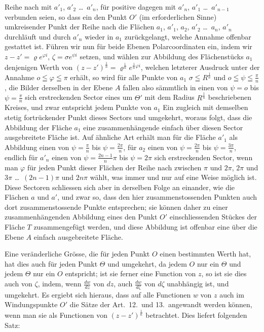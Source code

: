 \documentclass{article}
\begin{document}
Reihe nach mit $a'_1$, $a'_2$ \dots\ $a'_n$, für positive dagegen mit $a'_n$, $a'_1$ \dots\ $a'_{n-1}$ verbunden seien, so dass ein den Punkt $O'$ (im erforderlichen Sinne) umkreisender Punkt der Reihe nach die Flächen $a_1$, $a'_1$, $a_2$, $a'_2$ \dots\ $a_n$, $a'_n$ durchläuft und durch $a'_n$ wieder in $a_1$ zurückgelangt, welche Annahme offenbar gestattet ist. Führen wir nun für beide Ebenen Polarcoordinaten ein, indem wir $z - z' = \varrho e^{\varphi i}$, $\zeta = \sigma e^{\psi i}$ setzen, und wählen zur Abbildung des Flächenstücks $a_1$ denjenigen Werth von $(z - z')^{\frac{1}{n}} = \varrho^{\frac{1}{n}} e^{\frac{1}{n}\varphi i}$, welchen letzterer Ausdruck unter der Annahme $o \leqq \varphi \leqq \pi$ erhält, so wird für alle Punkte von $a_1$ $\sigma \leqq R^{\frac{1}{n}}$ und $o \leqq \psi \leqq \frac{\pi}{n}$, die Bilder derselben in der Ebene $A$ fallen also sämmtlich in einen von $\psi = o$ bis $\psi = \frac{\pi}{n}$ sich erstreckenden Sector eines um $\varTheta'$ mit dem Radius $R^{\frac{1}{n}}$ beschriebenen Kreises, und zwar entspricht jedem Punkte von $a_1$ Ein zugleich mit demselben stetig fortrückender Punkt dieses Sectors und umgekehrt, woraus folgt, dass die Abbildung der Fläche $a_1$ eine zusammenhängende einfach über diesen Sector ausgebreitete Fläche ist. Auf ähnliche Art erhält man für die Fläche $a'_1$ als Abbildung einen von $\psi = \frac{\pi}{n}$ bis $\psi = \frac{2\pi}{n}$, für $a_2$ einen von $\psi = \frac{2\pi}{n}$ bis $\psi = \frac{3\pi}{n}$, endlich für $a'_n$ einen von $\psi = \frac{2n - 1}{n}\pi$ bis $\psi = 2\pi$ sich erstreckenden Sector, wenn man $\varphi$ für jeden Punkt dieser Flächen der Reihe nach zwischen $\pi$ und $2\pi$, $2\pi$ und $3\pi$ \dots\ $(2n-1)\pi$ und $2n\pi$ wählt, was immer und nur auf eine Weise möglich ist. Diese Sectoren schliessen sich aber in derselben Folge an einander, wie die Flächen $a$ und $a'$, und zwar so, dass den hier zusammenstossenden Punkten auch dort zusammenstossende Punkte entsprechen; sie können daher zu einer zusammenhängenden Abbildung eines den Punkt $O'$ einschliessenden Stückes der Fläche $T$ zusammengefügt werden, und diese Abbildung ist offenbar eine über die Ebene $A$ einfach ausgebreitete Fläche.

Eine veränderliche Grösse, die für jeden Punkt $O$ einen bestimmten Werth hat, hat dies auch für jeden Punkt $\varTheta$ und umgekehrt, da jedem $O$ nur ein $\varTheta$ und jedem $\varTheta$ nur ein $O$ entspricht; ist sie ferner eine Function von $z$, so ist sie dies auch von $\zeta$, indem, wenn $\frac{dw}{dz}$ von $dz$, auch $\frac{dw}{d\zeta}$ von $d\zeta$ unabhängig ist, und umgekehrt. Es ergiebt sich hieraus, dass auf alle Functionen $w$ von $z$ auch im Windungspunkte $O'$ die Sätze der Art.~12.\ und 13.\ angewandt werden können, wenn man sie als Functionen von $(z - z')^{\frac{1}{n}}$ betrachtet. Dies liefert folgenden Satz:
\end{document}

